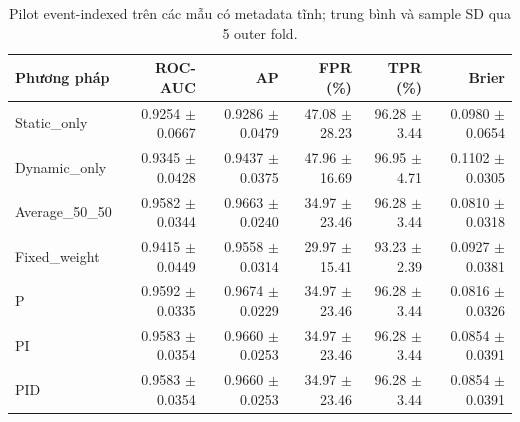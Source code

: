 \begin{table}[htbp]
\centering
\small
\caption{Pilot event-indexed trên các mẫu có metadata tĩnh; trung bình và sample SD qua 5 outer fold.}
\begin{tabular}{lrrrrr}
\toprule
Phương pháp & ROC-AUC & AP & FPR (\%) & TPR (\%) & Brier \\
\midrule
Static\_only & 0.9254 $\pm$ 0.0667 & 0.9286 $\pm$ 0.0479 & 47.08 $\pm$ 28.23 & 96.28 $\pm$ 3.44 & 0.0980 $\pm$ 0.0654 \\
Dynamic\_only & 0.9345 $\pm$ 0.0428 & 0.9437 $\pm$ 0.0375 & 47.96 $\pm$ 16.69 & 96.95 $\pm$ 4.71 & 0.1102 $\pm$ 0.0305 \\
Average\_50\_50 & 0.9582 $\pm$ 0.0344 & 0.9663 $\pm$ 0.0240 & 34.97 $\pm$ 23.46 & 96.28 $\pm$ 3.44 & 0.0810 $\pm$ 0.0318 \\
Fixed\_weight & 0.9415 $\pm$ 0.0449 & 0.9558 $\pm$ 0.0314 & 29.97 $\pm$ 15.41 & 93.23 $\pm$ 2.39 & 0.0927 $\pm$ 0.0381 \\
P & 0.9592 $\pm$ 0.0335 & 0.9674 $\pm$ 0.0229 & 34.97 $\pm$ 23.46 & 96.28 $\pm$ 3.44 & 0.0816 $\pm$ 0.0326 \\
PI & 0.9583 $\pm$ 0.0354 & 0.9660 $\pm$ 0.0253 & 34.97 $\pm$ 23.46 & 96.28 $\pm$ 3.44 & 0.0854 $\pm$ 0.0391 \\
PID & 0.9583 $\pm$ 0.0354 & 0.9660 $\pm$ 0.0253 & 34.97 $\pm$ 23.46 & 96.28 $\pm$ 3.44 & 0.0854 $\pm$ 0.0391 \\
\bottomrule
\end{tabular}
\end{table}
